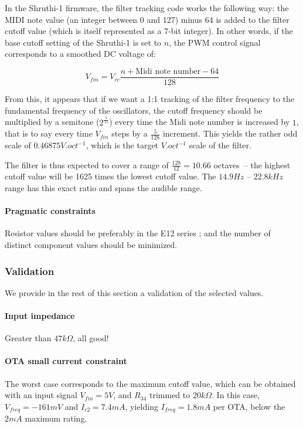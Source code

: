 \documentclass[a4paper,11pt]{article}
\begin{document}
In the Shruthi-1 firmware, the filter tracking code works the following way: the MIDI note value (an integer between 0 and 127) minus 64 is added to the filter cutoff value (which is itself represented as a 7-bit integer). In other words, if the base cutoff setting of the Shruthi-1 is set to $n$, the PWM control signal corresponds to a smoothed DC voltage of:

\begin{equation}
V_{fin} = V_{cc} \frac{n + \mbox{Midi note number} - 64}{128}
\end{equation}

From this, it appears that if we want a 1:1 tracking of the filter frequency to the fundamental frequency of the oscillators, the cutoff frequency should be multiplied by a semitone ($2^\frac{1}{12}$) every time the Midi note number is increased by $1$, that is to say every time $V_{fin}$ steps by a $\frac{5}{128}$ increment. This yields the rather odd scale of $0.46875V.oct^{-1}$, which is the target $V.oct^{-1}$ scale of the filter.

The filter is thus expected to cover a range of $\frac{128}{12} = 10.66$ octaves~-- the highest cutoff value will be 1625 times the lowest cutoff value. The $14.9 Hz$ -- $22.8kHz$ range has this exact ratio and spans the audible range.

\paragraph{Pragmatic constraints} Resistor values should be preferably in the E12 series ; and the number of distinct component values should be minimized.

\subsubsection{Validation}

We provide in the rest of this section a validation of the selected values.

\paragraph{Input impedance} Greater than $47k\Omega$, all good!

\paragraph{OTA small current constraint} The worst case corresponds to the maximum cutoff value, which can be obtained with an input signal $V_{fin} = 5V$, and $R_{34}$ trimmed to $20k\Omega$. In this case, $V_{freq} = -161mV$ and $I_{c2} = 7.4mA$, yielding $I_{freq} = 1.8mA$ per OTA, below the $2mA$ maximum rating.
\end{document}
